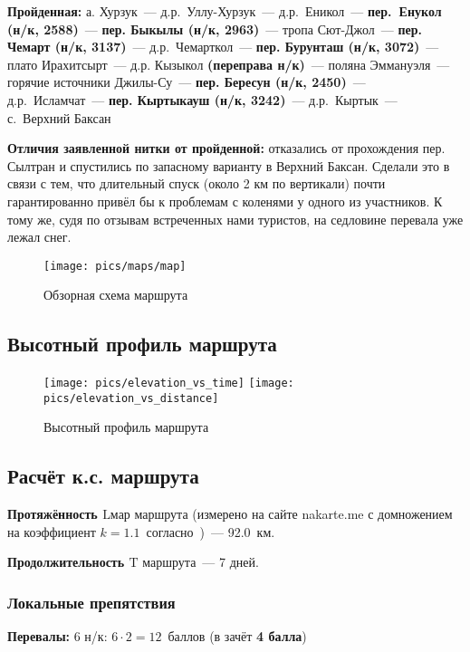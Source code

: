 \textbf{Пройденная:} а. Хурзук~--- д.р.~Уллу-Хурзук~--- д.р.~Еникол~--- \textbf{пер.~Енукол (н/к, 2588)}~--- \textbf{пер. Быкылы (н/к, 2963)}~--- тропа Сют-Джол~--- \textbf{пер. Чемарт (н/к, 3137)}~--- д.р.~Чемарткол~--- \textbf{пер. Бурунташ (н/к, 3072)}~--- плато Ирахитсырт~--- д.р. Кызыкол \textbf{(переправа н/к)}~--- поляна Эммануэля~--- горячие источники Джилы-Су~--- \textbf{пер. Бересун (н/к, 2450)}~--- д.р.~Исламчат~---\textbf{ пер. Кыртыкауш (н/к, 3242)}~--- д.р.~Кыртык~--- с.~Верхний Баксан

\textbf{Отличия заявленной нитки от пройденной:} отказались от прохождения пер. Сылтран и спустились по запасному варианту в Верхний Баксан. Сделали это в связи с тем, что длительный спуск (около 2 км по вертикали) почти гарантированно привёл бы к проблемам с коленями у одного из участников. К тому же, судя по отзывам встреченных нами туристов, на седловине перевала уже лежал снег.

\begin{figure}[h!tbp]
  	\centering	\texttt{[image: pics/maps/map]}
	\caption{Обзорная схема маршрута}
\end{figure}

\newpage
\subsection{Высотный профиль маршрута}

\begin{figure}[h!]
	\centering
	\texttt{[image: pics/elevation\_vs\_time]}
	\texttt{[image: pics/elevation\_vs\_distance]}
	\caption{Высотный профиль маршрута}
	\label{fig:heights}
\end{figure}

\newpage
\subsection{Расчёт к.с. маршрута}

\textbf{Протяжённость $\text{Lмар}$} маршрута (измерено на сайте nakarte.me с домножением на коэффициент $k=1.1$~согласно~\cite{method})~--- 92.0~км.

\textbf{Продолжительность $\text{T}$} маршрута~--- 7 дней.

\subsubsection{Локальные препятствия}
\textbf{Перевалы:} 6 н/к: $6\cdot2=12$~баллов (в зачёт \textbf{4 балла})

